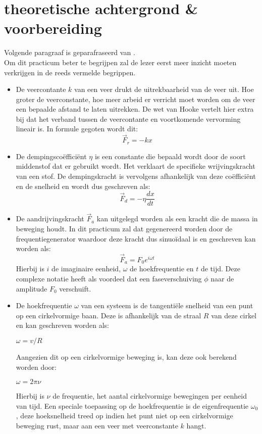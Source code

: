 \documentclass[12pt,a4]{article}
\begin{document}
\section{theoretische achtergrond \& voorbereiding}
Volgende paragraaf is geparafraseerd van \cite{a}.\\
Om dit practicum beter te begrijpen zal de lezer eerst meer inzicht moeten verkrijgen in de reeds vermelde begrippen.\\
\begin{itemize}
\item De veercontante $k$ van een veer drukt de uitrekbaarheid van de veer uit. Hoe groter de veerconstante, hoe meer arbeid er verricht moet worden om de veer een bepaalde afstand te laten uitrekken. De wet van Hooke vertelt hier extra bij dat het verband tussen de veercontante en voortkomende vervorming lineair is. In formule gegoten wordt dit:
\begin{equation}
\label{veerkracht}
\vec{F}_r = -kx
\end{equation} 
\item De dempingsco\"effici\"ent $\eta$ is een constante die bepaald wordt door de soort middenstof dat er gebruikt wordt. Het verklaart de specifieke wrijvingskracht van een stof. De dempingskracht is vervolgens afhankelijk van deze co\"effici\"ent en de snelheid en wordt dus geschreven als:
\begin{equation}
\label{wrijvingskracht}
\vec{F}_d = -\eta \frac{dx}{dt}
\end{equation} 
\item De aandrijvingskracht $\vec{F}_a$ kan uitgelegd worden als een kracht die de massa in beweging houdt. In dit practicum zal dat gegenereerd worden door de frequentiegenerator waardoor deze kracht dus sinuo\"idaal is en geschreven kan worden als:
\begin{equation}
\label{aandrijvingskracht}
\vec{F}_{a} = F_0 e^{i\omega t}
\end{equation}
Hierbij is $i$ de imaginaire eenheid, $\omega$ de hoekfrequentie en $t$ de tijd. Deze complexe notatie heeft als voordeel dat een faseverschuiving $\phi$ naar de amplitude $F_0$ verschuift.\\ 
\item De hoekfrequentie $\omega$ van een systeem is de tangenti\"ele snelheid van een punt op een cirkelvormige baan. Deze is afhankelijk van de straal $R$ van deze cirkel en kan geschreven worden als:
\begin{center}
$\omega = v/R$
\end{center}
Aangezien dit op een cirkelvormige beweging is, kan deze ook berekend worden door:
\begin{center}
$\omega = 2\pi\nu$
\end{center}
Hierbij is $\nu$ de frequentie, het aantal cirkelvormige bewegingen per eenheid van tijd. Een speciale toepassing op de hoekfrequentie is de eigenfrequentie $\omega_0$, deze hoeksnelheid treed op indien het punt niet op een cirkelvormige beweging rust, maar aan een veer met veerconstante $k$ hangt.\\ \\
\end{itemize}
\end{document}
